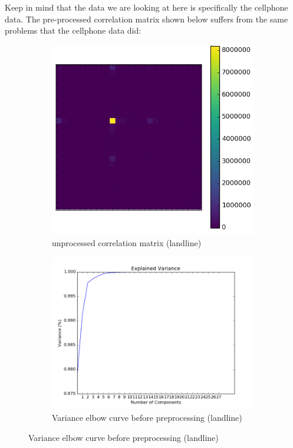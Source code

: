 \documentclass[20pt]{article} %
\begin{document}
Keep in mind that the data we are looking at here is specifically the cellphone data.  The pre-processed correlation matrix shown below suffers from the same problems that the cellphone data did:

\begin{figure}[!htbp]
  	\centering
   	\begin{subfigure}[p]{0.4\linewidth}
    	\includegraphics[width=\linewidth]{../figures/landline/raw_correlation_matrix.png}
	\caption{unprocessed correlation matrix (landline)}
   	\end{subfigure}
   	\begin{subfigure}[p]{0.4\linewidth}
    	\includegraphics[width=\linewidth]{../figures/landline/raw_variance_curve.png}
	\caption{Variance elbow curve before preprocessing (landline)}
   	\end{subfigure}
\end{figure} 
\end{document}
